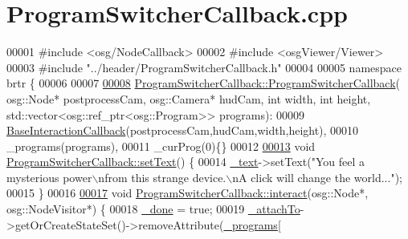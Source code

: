 \hypertarget{_program_switcher_callback_8cpp_source}{\section{Program\+Switcher\+Callback.\+cpp}
\label{_program_switcher_callback_8cpp_source}
}

\begin{DoxyCode}
00001 \textcolor{preprocessor}{#include <osg/NodeCallback>}
00002 \textcolor{preprocessor}{#include <osgViewer/Viewer>}
00003 \textcolor{preprocessor}{#include "../header/ProgramSwitcherCallback.h"}
00004 
00005 \textcolor{keyword}{namespace }brtr \{
00006   
00007 
\hypertarget{_program_switcher_callback_8cpp_source_l00008}{}\hyperlink{classbrtr_1_1_program_switcher_callback_a36a59e70c5db59a00f2d7fd7fbf9e505}{00008}     \hyperlink{classbrtr_1_1_program_switcher_callback_a36a59e70c5db59a00f2d7fd7fbf9e505}{ProgramSwitcherCallback::ProgramSwitcherCallback}(
      osg::Node* postprocessCam, osg::Camera* hudCam, \textcolor{keywordtype}{int} width, \textcolor{keywordtype}{int} height, std::vector<osg::ref\_ptr<osg::Program>> 
      programs):
00009         \hyperlink{classbrtr_1_1_base_interaction_callback}{BaseInteractionCallback}(postprocessCam,hudCam,width,height),
00010         \_programs(programs),
00011         \_curProg(0)\{\}
00012 
\hypertarget{_program_switcher_callback_8cpp_source_l00013}{}\hyperlink{classbrtr_1_1_program_switcher_callback_a2202619d98a432578c8ed7342b957638}{00013}     \textcolor{keywordtype}{void} \hyperlink{classbrtr_1_1_program_switcher_callback_a2202619d98a432578c8ed7342b957638}{ProgramSwitcherCallback::setText}() \{
00014         \hyperlink{classbrtr_1_1_base_interaction_callback_af60dece4300b09fafe3c048397122cbd}{\_text}->setText(\textcolor{stringliteral}{"You feel a mysterious power\(\backslash\)nfrom this strange device.\(\backslash\)nA click will change
       the world..."});
00015     \}
00016 
\hypertarget{_program_switcher_callback_8cpp_source_l00017}{}\hyperlink{classbrtr_1_1_program_switcher_callback_a06dd3fc2b09d3138e67599d8d56db62a}{00017}     \textcolor{keywordtype}{void} \hyperlink{classbrtr_1_1_program_switcher_callback_a06dd3fc2b09d3138e67599d8d56db62a}{ProgramSwitcherCallback::interact}(osg::Node*, osg::NodeVisitor*) 
      \{
00018         \hyperlink{classbrtr_1_1_base_interaction_callback_a2f36052886ec60a227e0734bfbc4bdbb}{\_done} = \textcolor{keyword}{true};
00019         \hyperlink{classbrtr_1_1_base_interaction_callback_a6666bae9f8f89ebbf75637c922ebfb54}{\_attachTo}->getOrCreateStateSet()->removeAttribute(\hyperlink{classbrtr_1_1_program_switcher_callback_a9cbcf4d65f6ee468bb20d16b9e795e49}{\_programs}[

\end{DoxyCode}
